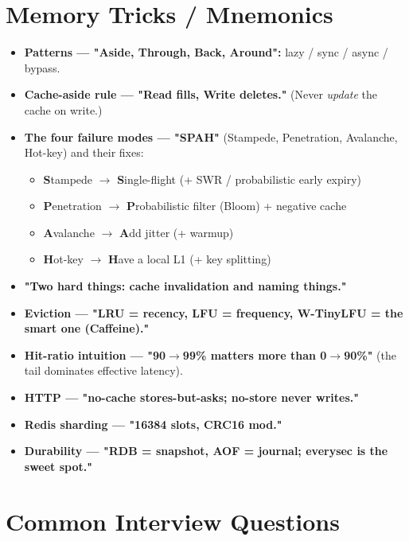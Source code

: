 \documentclass[11pt]{article}
\providecommand{\tightlist}{\setlength{\itemsep}{1pt}\setlength{\parskip}{0pt}}
\begin{document}
\section{Memory Tricks / Mnemonics}\label{memory-tricks--mnemonics}

\begin{itemize}
\tightlist
\item
  \textbf{Patterns --- "Aside, Through, Back, Around":} lazy / sync / async / bypass.
\item
  \textbf{Cache-aside rule --- "Read fills, Write deletes."} (Never \emph{update} the cache on write.)
\item
  \textbf{The four failure modes --- "SPAH"} (Stampede, Penetration, Avalanche, Hot-key) and their fixes:

  \begin{itemize}
  \tightlist
  \item
    \textbf{S}tampede \(\rightarrow\) \textbf{S}ingle-flight (+ SWR / probabilistic early expiry)
  \item
    \textbf{P}enetration \(\rightarrow\) \textbf{P}robabilistic filter (Bloom) + negative cache
  \item
    \textbf{A}valanche \(\rightarrow\) \textbf{A}dd jitter (+ warmup)
  \item
    \textbf{H}ot-key \(\rightarrow\) \textbf{H}ave a local L1 (+ key splitting)
  \end{itemize}
\item
  \textbf{"Two hard things: cache invalidation and naming things."}
\item
  \textbf{Eviction --- "LRU = recency, LFU = frequency, W-TinyLFU = the smart one (Caffeine)."}
\item
  \textbf{Hit-ratio intuition --- "90\(\rightarrow\)99\% matters more than 0\(\rightarrow\)90\%"} (the tail dominates effective latency).
\item
  \textbf{HTTP --- "no-cache stores-but-asks; no-store never writes."}
\item
  \textbf{Redis sharding --- "16384 slots, CRC16 mod."}
\item
  \textbf{Durability --- "RDB = snapshot, AOF = journal; everysec is the sweet spot."}
\end{itemize}

\section{Common Interview Questions}\label{common-interview-questions}
\end{document}
